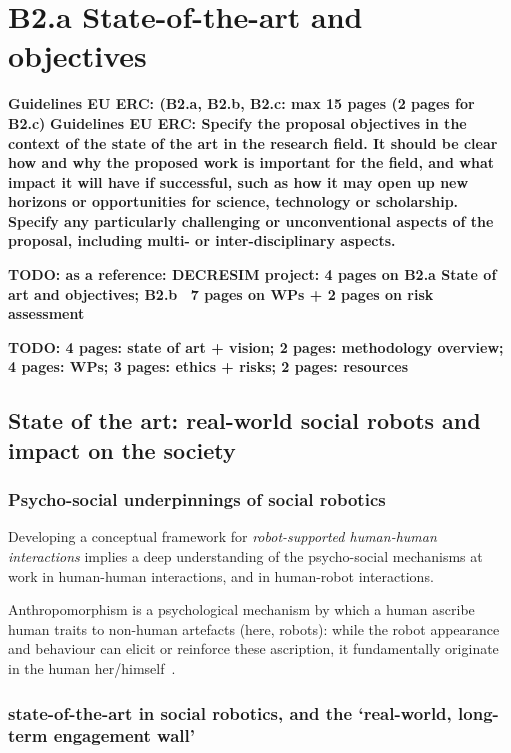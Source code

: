 \documentclass[11pt,a4paper]{report}
\newcommand{\TODO}[1]{{\color{red}\textbf{TODO: #1}}}
\newcommand{\eu}[1]{{\color{teal}\textbf{Guidelines EU ERC: #1}}}
\begin{document}
\chapter{B2.a State-of-the-art and objectives}

\eu{(B2.a, B2.b, B2.c: max 15 pages (2 pages for B2.c)}
\eu{Specify the proposal objectives in the context of the state
of the art in the research field. It should be clear how and why the proposed work is important for
the field, and what impact it will have if successful, such as how it may open up new horizons or
opportunities for science, technology or scholarship. Specify any particularly challenging or
unconventional aspects of the proposal, including multi- or inter-disciplinary aspects.}

\TODO{as a reference: DECRESIM project: 4 pages on B2.a State of art and
objectives; B2.b ~7 pages on WPs + 2 pages on risk assessment}

\TODO{4 pages: state of art + vision; 2 pages: methodology overview; 4 pages:
WPs; 3 pages: ethics + risks; 2 pages: resources}



\section{State of the art: real-world social robots and impact on the
society}


\subsection{Psycho-social underpinnings of social robotics}

Developing a conceptual framework for \emph{robot-supported human-human
interactions} implies a deep understanding of the psycho-social mechanisms at
work in human-human interactions, and in human-robot interactions.

Anthropomorphism is a psychological mechanism by which a human
ascribe human traits to non-human artefacts (here, robots): while the
robot appearance and behaviour can elicit or reinforce these ascription,
it fundamentally originate in the human her/himself~\cite{fink}.





\subsection{state-of-the-art in social robotics, and the `real-world, long-term
engagement wall'}
\end{document}
